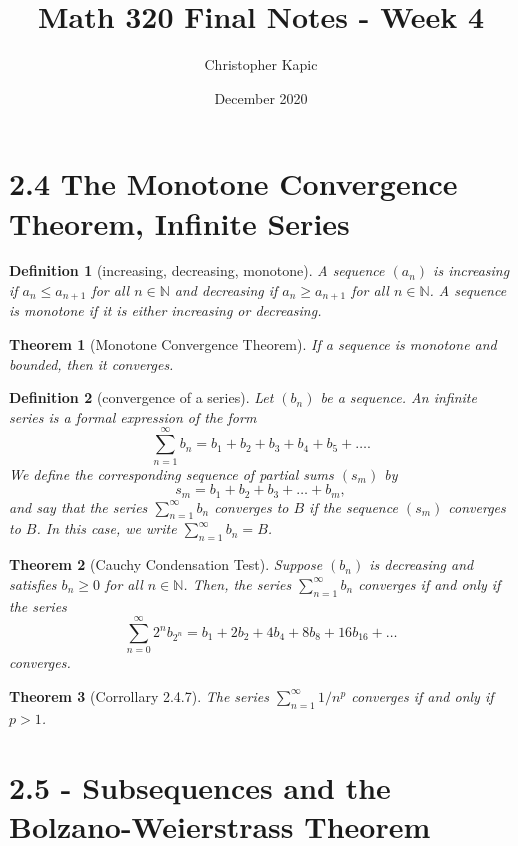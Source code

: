 \documentclass{article}
\title{Math 320 Final Notes - Week 4}
\author{Christopher Kapic}
\date{December 2020}
\newtheorem{definition}{Definition}
\newtheorem{theorem}{Theorem}
\begin{document}
\maketitle

\section*{2.4 The Monotone Convergence Theorem, Infinite Series}

\begin{definition}[increasing, decreasing, monotone]
    A sequence $(a_n)$ is \textit{increasing} if $a_n \leq a_{n+1}$ for all $n \in \mathbb{N}$ and \textit{decreasing} if $a_n \geq a_{n+1}$ for all $n \in \mathbb{N}$. A sequence is \textit{monotone} if it is either increasing or decreasing.
\end{definition}

\begin{theorem}[Monotone Convergence Theorem]
    If a sequence is monotone and bounded, then it converges.
\end{theorem}

\begin{definition}[convergence of a series]
    Let $(b_n)$ be a sequence. An \textit{infinite series} is a formal expression of the form \[\sum _{n = 1}^\infty b_n = b_1 + b_2 + b_3 + b_4 + b_5 + \dots .\]
    We define the corresponding \textit{sequence of partial sums} $(s_m)$ by \[s_m = b_1 + b_2 + b_3 + \dots + b_m,\] and say that the series $\sum _{n=1}^\infty b_n$ \textit{converges} to $B$ if the sequence $(s_m)$ converges to $B$. In this case, we write $\sum _{n=1}^\infty b_n = B$.
\end{definition}

\begin{theorem}[Cauchy Condensation Test]
    Suppose $(b_n)$ is decreasing and satisfies $b_n \geq 0$ for all $n \in \mathbb{N}$. Then, the series $\sum _{n=1}^\infty b_n$ converges if and only if the series \[\sum _{n=0}^\infty 2^nb_{2^n}=b_1+2b_2+4b_4+8b_8+16b_{16}+\dots \] converges.
\end{theorem}

\begin{theorem}[Corrollary 2.4.7]
    The series $\sum _{n=1}^\infty 1/n^p$ converges if and only if $p > 1$.
\end{theorem}

\section*{2.5 - Subsequences and the Bolzano-Weierstrass Theorem}
\end{document}
